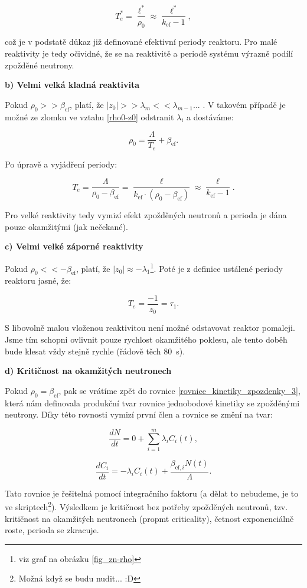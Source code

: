 $$ T_e^* = \dfrac{\ell^*}{\rho_0} \approx \dfrac{\ell^*}{k_{\text{ef}}-1}, $$

\noindent což je v podstatě důkaz již definované efektivní periody reaktoru. Pro malé reaktivity je tedy očividné, že se na reaktivitě a periodě systému výrazně podílí zpožděné neutrony.

\textbf{b) Velmi velká kladná reaktivita}

Pokud $\rho_0 >> \beta_{\text{ef}}$, platí, že $|z_0| >> \lambda_m << \lambda_{m-1} ...$ . V takovém případě je možné ze zlomku ve vztahu \eqref{rho0-z0} odstranit $\lambda_i$ a dostáváme:

$$ \rho_0 = \dfrac{\Lambda}{T_e} + \beta_{\text{ef}}. $$

Po úpravě a vyjádření periody:

$$ T_e = \dfrac{\Lambda}{\rho_0 - \beta_{\text{ef}}} = \dfrac{\ell}{k_{\text{ef}} \cdot (\rho_0 - \beta_{\text{ef}})} \approx \dfrac{\ell}{k_{\text{ef}}-1}. $$

Pro velké reaktivity tedy vymizí efekt zpožděných neutronů a perioda je dána pouze okamžitými (jak nečekané).

\textbf{c) Velmi velké záporné reaktivity}

Pokud $\rho_0 << -\beta_{\text{ef}}$, platí, že $|z_0| \approx -\lambda_1$\footnote{viz graf na obrázku \ref{fig_zn-rho}}. Poté je z definice ustálené periody reaktoru jasné, že:

$$ T_e = \dfrac{-1}{z_0} = \tau_1. $$

S libovolně malou vloženou reaktivitou není možné odstavovat reaktor pomaleji. Jsme tím schopni ovlivnit pouze rychlost okamžitého poklesu, ale tento doběh bude klesat vždy stejně rychle (řádově těch 80~s).

\textbf{d) Kritičnost na okamžitých neutronech}

Pokud $\rho_0 = \beta_{\text{ef}}$, pak se vrátíme zpět do rovnice \eqref{rovnice_kinetiky_zpozdenky_3}, která nám definovala produkční tvar rovnice jednobodové kinetiky se zpožděnými neutrony. Díky této rovnosti vymizí první člen a rovnice se změní na tvar:

$$ \dfrac{dN}{dt} = 0 + \sum_{i=1}^m \lambda_i C_i(t), $$

$$ \dfrac{dC_i}{dt} = -\lambda_i C_i(t) + \dfrac{\beta_{\text{ef},i}  N(t)}{\Lambda}. $$

Tato rovnice je řešitelná pomocí integračního faktoru (a dělat to nebudeme, je to ve skriptech\footnote{Možná když se budu nudit... :D}). Výsledkem je kritičnost bez potřeby zpožděných neutronů, tzv. kritičnost na okamžitých neutronech (propmt criticality), četnost exponenciálně roste, perioda se zkracuje.

